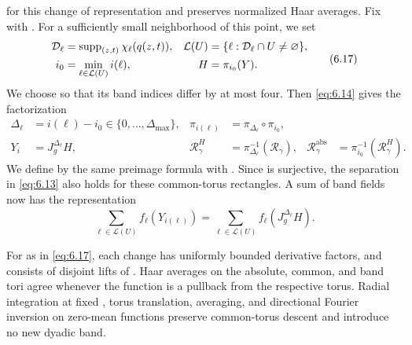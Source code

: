 %
for this change of representation and preserves normalized Haar averages. Fix
 with
. For a sufficiently small
neighborhood  of this point, we set
\begin{equation}
  \begin{aligned}
    \mathcal D_\ell&=\operatorname{supp}_{(z,t)}\chi_\ell(q(z,t)),
      & \mathcal L(U)&=\{\ell:\mathcal D_\ell\cap U\ne\varnothing\},\\
    i_0&=\min_{\ell\in\mathcal L(U)}i(\ell),
      & H&=\pi_{i_0}(Y).
  \end{aligned}
  \tag{6.17}\label{eq:6.17}
\end{equation}
We choose  so that its band indices differ by at most
four. Then \eqref{eq:6.14} gives the factorization
\begin{equation}
  \begin{aligned}
    \Delta_\ell&=i(\ell)-i_0\in\{0,\ldots,\Delta_{\max}\},
      & \pi_{i(\ell)}&=\pi_{\Delta_\ell}\circ\pi_{i_0},\\
    Y_i&=J_g^{\Delta_\ell}H,
      & \mathcal R_\gamma^H&=\pi_{\Delta_\ell}^{-1}(\mathcal R_\gamma),
      & \mathcal R_\gamma^{\mathrm{abs}}
        &=\pi_{i_0}^{-1}(\mathcal R_\gamma^H).
  \end{aligned}
  \tag{6.18}\label{eq:6.18}
\end{equation}
We define  by the same preimage
formula with . Since
 is surjective, the separation in
\eqref{eq:6.13} also holds for these common-torus rectangles. A sum of band
fields now has the representation
\[
  \sum_{\ell\in\mathcal L(U)}f_\ell(Y_{i(\ell)})
  =\sum_{\ell\in\mathcal L(U)}f_\ell(J_g^{\Delta_\ell}H).
\]

\begin{lemma}\label{lem:6.2}
For  as in \eqref{eq:6.17}, each change
 has uniformly bounded derivative factors,
and  consists of
 disjoint lifts
of . Haar averages on the absolute,
common, and band tori agree whenever the function is a pullback from the
respective torus. Radial integration at fixed ,
torus translation, averaging, and directional Fourier inversion on zero-mean
functions preserve common-torus descent and introduce no new dyadic band.
\end{lemma}

